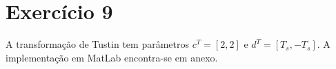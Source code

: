 \section*{Exercício 9}
\label{ex:9}

    A transformação de Tustin tem parâmetros $c^T = [2, 2]$ e $d^T = [T_s, -T_s]$. A implementação em MatLab encontra-se em anexo.
